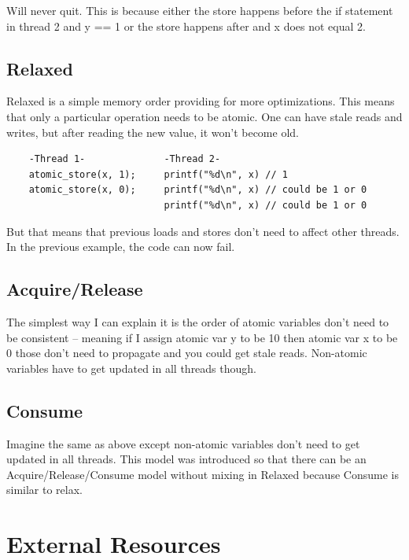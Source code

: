 Will never quit.
This is because either the store happens before the if statement in thread 2 and y == 1 or the store happens after and x does not equal 2.

\subsection{Relaxed}

Relaxed is a simple memory order providing for more optimizations.
This means that only a particular operation needs to be atomic.
One can have stale reads and writes, but after reading the new value, it won't become old.

\begin{verbatim}
    -Thread 1-              -Thread 2-
    atomic_store(x, 1);     printf("%d\n", x) // 1
    atomic_store(x, 0);     printf("%d\n", x) // could be 1 or 0
                            printf("%d\n", x) // could be 1 or 0
\end{verbatim}

But that means that previous loads and stores don't need to affect other threads.
In the previous example, the code can now fail.

\subsection{Acquire/Release}

The simplest way I can explain it is the order of atomic variables don't need to be consistent -- meaning if I assign atomic var y to be 10 then atomic var x to be 0 those don't need to propagate and you could get stale reads.
Non-atomic variables have to get updated in all threads though.

\subsection{Consume}

Imagine the same as above except non-atomic variables don't need to get updated in all threads.
This model was introduced so that there can be an Acquire/Release/Consume model without mixing in Relaxed because Consume is similar to relax.

\section{External Resources}

